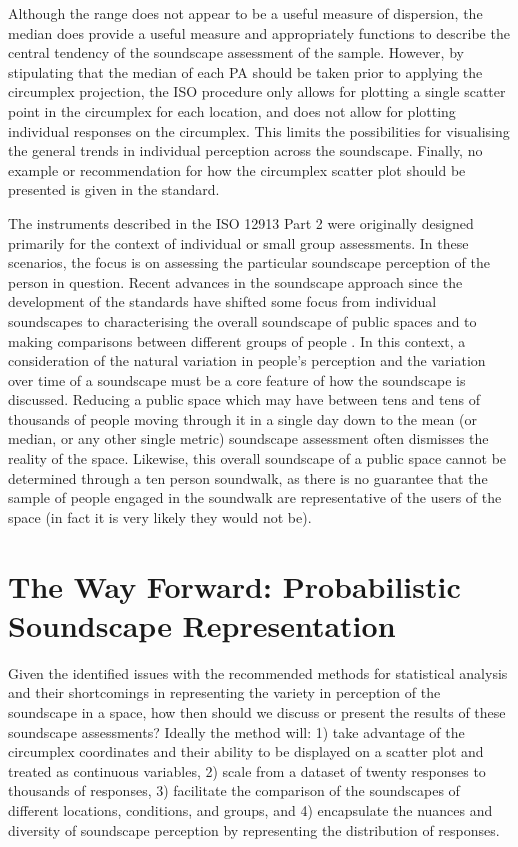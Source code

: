 Although the range does not appear to be a useful measure of dispersion, the median does provide a useful measure and appropriately functions to describe the central tendency of the  soundscape assessment of the sample. However, by stipulating that the median of each PA should be taken prior to applying the circumplex projection, the ISO procedure only allows for plotting a single scatter point in the circumplex for each location, and does not allow for plotting individual responses on the circumplex. This limits the possibilities for visualising the general trends in individual perception across the soundscape. Finally, no example or recommendation for how the circumplex scatter plot should be presented is given in the standard.

The instruments described in the ISO 12913 Part 2 \citep{ISO12913Part2} were originally designed primarily for the context of individual or small group assessments. In these scenarios, the focus is on assessing the particular soundscape perception of the person in question. Recent advances in the soundscape approach since the development of the standards have shifted some focus from individual soundscapes to characterising the overall soundscape of public spaces \citep{Mitchell2020Soundscape} and to making comparisons between different groups of people \citep{Jeon2018cross}. In this context, a consideration of the natural variation in people's perception and the variation over time of a soundscape must be a core feature of how the soundscape is discussed. Reducing a public space which may have between tens and tens of thousands of people moving through it in a single day down to the mean (or median, or any other single metric) soundscape assessment often dismisses the reality of the space. Likewise, this overall soundscape of a public space cannot be determined through a ten person soundwalk, as there is no guarantee that the sample of people engaged in the soundwalk are representative of the users of the space (in fact it is very likely they would not be).


\section{The Way Forward: Probabilistic Soundscape Representation}
Given the identified issues with the recommended methods for statistical analysis and their shortcomings in representing the variety in perception of the soundscape in a space, how then should we discuss or present the results of these soundscape assessments? Ideally the method will: 1) take advantage of the circumplex coordinates and their ability to be displayed on a scatter plot and treated as continuous variables, 2) scale from a dataset of twenty responses to thousands of responses, 3) facilitate the comparison of the soundscapes of different locations, conditions, and groups, and 4) encapsulate the nuances and diversity of soundscape perception by representing the distribution of responses.

